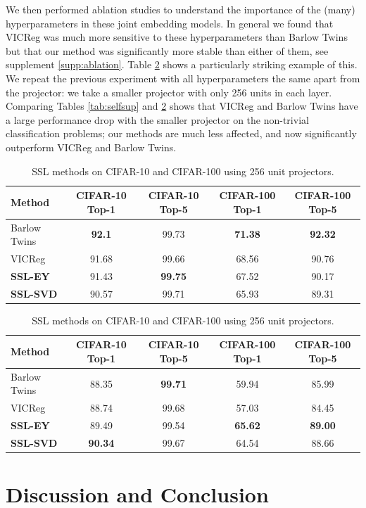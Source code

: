 We then performed ablation studies to understand the importance of the (many) hyperparameters in these joint embedding models. In general we found that VICReg was much more sensitive to these hyperparameters than Barlow Twins but that our method was significantly more stable than either of them, see supplement \ref{supp:ablation}.
Table \ref{tab:selfsupsmaller} shows a particularly striking example of this. 
We repeat the previous experiment with all hyperparameters the same apart from the projector: we take a smaller projector with only 256 units in each layer. 
Comparing Tables \ref{tab:selfsup} and \ref{tab:selfsupsmaller} shows that VICReg and Barlow Twins have a large performance drop with the smaller projector on the non-trivial classification problems; our methods are much less affected, and now significantly outperform VICReg and Barlow Twins.
 

\begin{table}[h] 
\centering 
\begin{tabular}{lcccc} 
\hline 
Method & CIFAR-10 Top-1 & CIFAR-10 Top-5 & CIFAR-100 Top-1 & CIFAR-100 Top-5 \\ 
\hline 
Barlow Twins & \textbf{92.1} & 99.73 & \textbf{71.38} & \textbf{92.32}\\
VICReg & 91.68	&99.66 & 68.56&	90.76 \\
\textbf{SSL-EY} & 91.43& \textbf{99.75}& 67.52& 90.17\\
\textbf{SSL-SVD} & 90.57 & 99.71 & 65.93 & 89.31 \\
\hline 
\end{tabular} \caption{SSL methods on CIFAR-10 and CIFAR-100 using 2048 unit projectors.} \label{tab:selfsup}
\centering 
\begin{tabular}{lcccc} 
\hline 
Method & CIFAR-10 Top-1 & CIFAR-10 Top-5 & CIFAR-100 Top-1 & CIFAR-100 Top-5 \\ 
\hline 
Barlow Twins & 88.35 & \textbf{99.71} & 59.94 & 85.99 \\
VICReg & 88.74 & 99.68 & 57.03& 84.45 \\
\textbf{SSL-EY} & 89.49 & 99.54 & \textbf{65.62}& \textbf{89.00}\\
\textbf{SSL-SVD} & \textbf{90.34} & 99.67 & 64.54 & 88.66 \\
\hline 
\end{tabular} \caption{SSL methods on CIFAR-10 and CIFAR-100 using 256 unit projectors.} \label{tab:selfsupsmaller} \end{table}

\section{Discussion and Conclusion}






